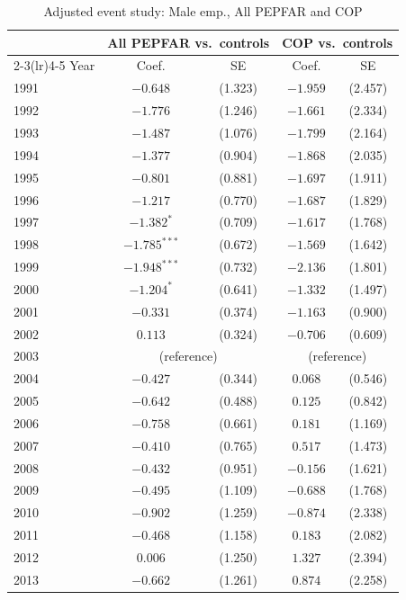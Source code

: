 \begin{table}[htbp]
\centering
\small
\caption{Adjusted event study: Male emp., All PEPFAR and COP}
\label{tab:crown_es_combined_emp_male}
\begin{tabular}{lcccc}
\toprule
 & \multicolumn{2}{c}{All PEPFAR vs.\ controls} & \multicolumn{2}{c}{COP vs.\ controls} \\
\cmidrule(lr){2-3}\cmidrule(lr){4-5}
Year & Coef. & SE & Coef. & SE \\
\midrule
1991 & $-0.648$ & (1.323) & $-1.959$ & (2.457) \\
1992 & $-1.776$ & (1.246) & $-1.661$ & (2.334) \\
1993 & $-1.487$ & (1.076) & $-1.799$ & (2.164) \\
1994 & $-1.377$ & (0.904) & $-1.868$ & (2.035) \\
1995 & $-0.801$ & (0.881) & $-1.697$ & (1.911) \\
1996 & $-1.217$ & (0.770) & $-1.687$ & (1.829) \\
1997 & $-1.382^{*}$ & (0.709) & $-1.617$ & (1.768) \\
1998 & $-1.785^{***}$ & (0.672) & $-1.569$ & (1.642) \\
1999 & $-1.948^{***}$ & (0.732) & $-2.136$ & (1.801) \\
2000 & $-1.204^{*}$ & (0.641) & $-1.332$ & (1.497) \\
2001 & $-0.331$ & (0.374) & $-1.163$ & (0.900) \\
2002 & $0.113$ & (0.324) & $-0.706$ & (0.609) \\
2003 & \multicolumn{2}{c}{(reference)} & \multicolumn{2}{c}{(reference)} \\
2004 & $-0.427$ & (0.344) & $0.068$ & (0.546) \\
2005 & $-0.642$ & (0.488) & $0.125$ & (0.842) \\
2006 & $-0.758$ & (0.661) & $0.181$ & (1.169) \\
2007 & $-0.410$ & (0.765) & $0.517$ & (1.473) \\
2008 & $-0.432$ & (0.951) & $-0.156$ & (1.621) \\
2009 & $-0.495$ & (1.109) & $-0.688$ & (1.768) \\
2010 & $-0.902$ & (1.259) & $-0.874$ & (2.338) \\
2011 & $-0.468$ & (1.158) & $0.183$ & (2.082) \\
2012 & $0.006$ & (1.250) & $1.327$ & (2.394) \\
2013 & $-0.662$ & (1.261) & $0.874$ & (2.258) \\

\end{tabular}
\end{table}
